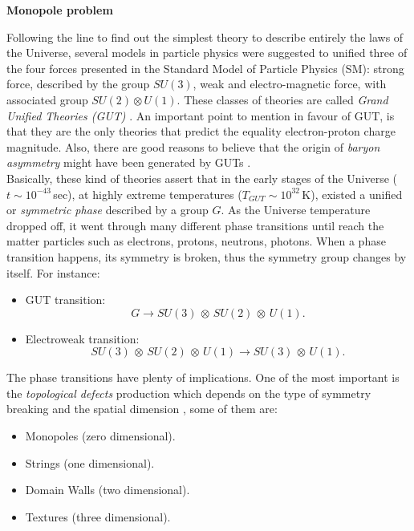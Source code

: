 \documentclass{rmaa}
\begin{document}
\vskip 16pt
\textbf{Monopole problem} 
\vskip 10pt

Following the line to find out the simplest theory to describe entirely the laws of the Universe,
several models in particle physics were suggested to unified three of the 
four forces presented in the Standard Model of Particle Physics (SM): strong force, described
by the group $SU(3)$, weak and electro-magnetic force, with associated group $SU(2)\otimes U(1)$. 
These classes of theories are called \textit{Grand Unified Theories (GUT)} \citep{Georgi}.
 An important point to mention in favour of GUT,  is that they are the only theories that 
 predict the equality electron-proton charge magnitude. Also, there are good reasons to 
 believe that the origin of \textit{baryon asymmetry} might have been generated by GUTs \citep{Kolb83}.
\\

Basically, these kind of theories assert that in the early stages of the Universe ($t \sim 10^{-43}\, $sec), 
at highly extreme temperatures ($T_{GUT}\sim 10^{32} \, $K), existed a unified or 
\textit{symmetric phase} described by a group $G$. As the Universe
temperature dropped off, it went through many different phase transitions until reach 
the matter particles such as electrons, protons, neutrons, photons.
%
When a phase transition happens, its symmetry is broken, thus the symmetry group changes by itself.
For instance: 
 \begin{itemize}
 \item GUT transition: $$G \to SU(3)\,\otimes\, SU(2)\, \otimes \, U(1).$$
 \item Electroweak transition: $$SU(3)\,\otimes\, SU(2)\, \otimes \, U(1) \to SU(3)\, \otimes \, U(1).$$ 
\end{itemize}

\noindent
The phase transitions have plenty of implications. One of the most important is the
\textit{topological defects} production which depends on the type of symmetry breaking 
and the spatial dimension \citep{Vilenkin}, some of them are:   

\begin{itemize}
\item Monopoles (zero dimensional).
\item Strings (one dimensional).
\item Domain Walls (two dimensional).
\item Textures (three dimensional).
\end{itemize}
\end{document}
